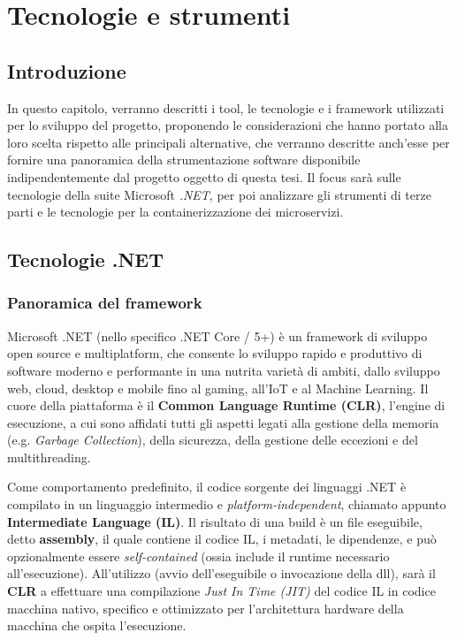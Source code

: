 \chapter{Tecnologie e strumenti}
\section{Introduzione}
In questo capitolo, verranno descritti i tool, le tecnologie e i framework utilizzati per lo sviluppo del progetto, proponendo le considerazioni che hanno portato alla loro scelta rispetto alle principali alternative, che verranno descritte anch'esse per fornire una panoramica della strumentazione software disponibile indipendentemente dal progetto oggetto di questa tesi.
Il focus sarà sulle tecnologie della suite Microsoft \emph{.NET}, per poi analizzare gli strumenti di terze parti e le tecnologie per la containerizzazione dei microservizi.

\section{Tecnologie .NET}
\subsection{Panoramica del framework}
Microsoft .NET (nello specifico .NET Core / 5+) è un framework di sviluppo open source e multiplatform, che consente lo sviluppo rapido e produttivo di software moderno e performante in una nutrita varietà di ambiti, dallo sviluppo web, cloud, desktop e mobile fino al gaming, all'IoT e al Machine Learning.
Il cuore della piattaforma è il \textbf{Common Language Runtime (CLR)}, l'engine di esecuzione, a cui sono affidati tutti gli aspetti legati alla gestione della memoria (e.g. \emph{Garbage Collection}), della sicurezza, della gestione delle eccezioni e del multithreading.

Come comportamento predefinito, il codice sorgente dei linguaggi .NET è compilato in un linguaggio intermedio e \emph{platform-independent}, chiamato appunto \textbf{Intermediate Language (IL)}. Il risultato di una build è un file eseguibile, detto \textbf{assembly}, il quale contiene il codice IL, i metadati, le dipendenze, e può opzionalmente essere \emph{self-contained} (ossia include il runtime necessario all'esecuzione). All'utilizzo (avvio dell'eseguibile o invocazione della dll), sarà il \textbf{CLR} a effettuare una compilazione \emph{Just In Time (JIT)} del codice IL in codice macchina nativo, specifico e ottimizzato per l'architettura hardware della macchina che ospita l'esecuzione.


